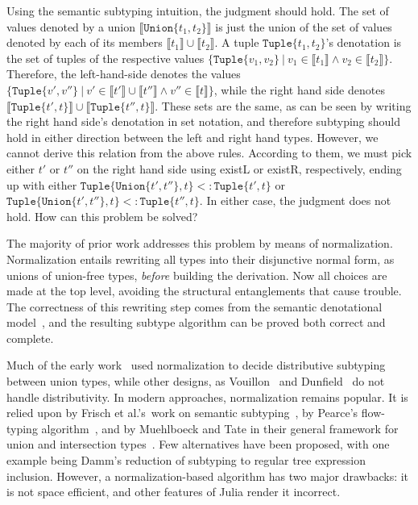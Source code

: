 \documentclass[a4paper,english]{lipics-v2019}
\newcommand{\xt}[1]{\texttt{#1}}
\newcommand{\union}[2]{\xt{Union\{}#1,#2\xt{\}}}
\newcommand{\denotes}[1]{\llbracket #1 \rrbracket}
\newcommand{\sub}{<:}
\newcommand{\tuple}[1]{\xt{Tuple\{}#1\xt{\}}}
\begin{document}
\noindent Using the semantic subtyping intuition, the judgment should hold.
The set of values denoted by a union {\small $\denotes{\union{t_1}{t_2}}$} is
just the union of the set of values denoted by each of its members {\small
$\denotes{t_1} \cup \denotes{t_2}$}. A tuple {\small $\tuple{t_1,t_2}$}'s
denotation is the set of tuples of the respective values {\small
$\{\tuple{v_1,v_2}~|~v_1 \in \denotes{t_1} \wedge v_2\in\denotes{t_2}\}$}.
Therefore, the left-hand-side denotes the values {\small $\{\tuple{v',v''} ~|~
v' \in  \llbracket t' \rrbracket \cup \llbracket t'' \rrbracket \wedge v'' \in
\llbracket t \rrbracket\}$}, while the right hand side denotes {\small
$\llbracket \tuple{t', t} \rrbracket \cup \llbracket \tuple{t'', t}
\rrbracket$}.  These sets are the same, as can be seen by writing the right
hand side's denotation in set notation, and therefore subtyping should hold
in either direction between the left and right hand types. However, we cannot
derive this relation from the above rules. According to them, we must pick
either {\small $t'$} or {\small $t''$} on the right hand side using existL or
existR, respectively, ending up with either {\small $\tuple{\union{t'}{t''},
t} \sub \tuple{t', t}$} or {\small $\tuple{\union{t'}{t''}, t} \sub
\tuple{t'', t}$}. In either case, the judgment does not hold. How can this
problem be solved?

The majority of prior work addresses this problem by means of normalization.
Normalization entails rewriting all types into their disjunctive normal form,
as unions of union-free types, \emph{before} building the derivation. Now all
choices are made at the top level, avoiding the structural entanglements that
cause trouble. The correctness of this rewriting step comes from the semantic
denotational model~\cite{Frisch08}, and the resulting subtype algorithm can be
proved both correct and complete.

Much of the early work~\cite{barbanera1991intersection,Pierce1991,aiken1991implementing} used
normalization to decide distributive subtyping between union types, while
other designs, as Vouillon~\cite{Vouillon04} and Dunfield~\cite{DBLP:journals/jfp/Dunfield14} do not handle distributivity. 
In modern approaches,  normalization remains popular. It is
relied upon by Frisch et al.'s\ work on semantic subtyping~\cite{Frisch08}, by Pearce's
flow-typing algorithm~\cite{DBLP:conf/vmcai/Pearce13}, and by
Muehlboeck and Tate in their general framework for union and intersection
types~\cite{muehlboeck2018empowering}. Few alternatives have been proposed, with
one example being Damm\cite{DBLP:conf/tacs/Damm94}'s reduction of subtyping to regular tree
expression inclusion. However, a normalization-based
algorithm has two major drawbacks: it is not space efficient, and
other features of Julia render it incorrect.
\end{document}
